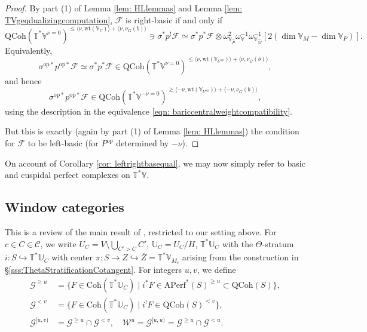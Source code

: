 \documentclass{amsart}
\theoremstyle{definition}
\theoremstyle{remark}
\numberwithin{equation}{section}
\newcommand{\U}{\mathbb{U}}
\newcommand{\mc}{\mathcal}
\newcommand{\op}{\mathrm{op}}
\newcommand{\wh}{\widehat}
\newcommand{\QCoh}{\mathrm{QCoh}}
\newcommand{\Coh}{\mathrm{Coh}}
\newcommand{\V}{\mathbb{V}}
\newcommand{\T}{\mathbb{T}}
\newcommand{\Aperf}{\mathrm{APerf}}
\newcommand{\wt}{\mathrm{wt}}
\begin{document}
\begin{proof}
By part (1) of Lemma \ref{lem: HLlemmas} and Lemma \ref{lem: TVgeqdualizingcomputation}, $\mc{F}$ is right-basic if and only if
\begin{equation*}
   \QCoh(\T^{\ast}\V^{\nu = 0})^{ \leq \langle \nu, \wt(\V_U) \rangle + \langle \nu, \nu_G(b)\rangle}  \ni \sigma^{\ast} p^! \mc{F} \simeq \sigma^{\ast} p^{\ast} \mc{F} \otimes \omega^2_{\V_{\wh{P}}}\omega_{\V}^{-1} \omega_{\V_{\wh{M}}}^{-1}[2(\dim \V_M - \dim \V_P)].
\end{equation*}
Equivalently,
\begin{equation*}
    \sigma^{\op \ast}p^{\op \ast} \mc{F} \simeq \sigma^{\ast}p^{\ast} \mc{F} \in \QCoh(\T^{\ast}\V^{\nu = 0})^{ \leq \langle \nu, \wt(\V_{U^{\op}}) \rangle + \langle \nu, \nu_G(b)\rangle},
\end{equation*}
and hence
\begin{equation*}
    \sigma^{\op \ast}p^{\op \ast} \mc{F} \in \QCoh(\T^{\ast}\V^{-\nu = 0})^{ \geq \langle -\nu, \wt(\V_{U^{\op}}) \rangle + \langle -\nu, \nu_G(b)\rangle},
\end{equation*}
using the description in the equivalence \eqref{eqn: bariccentralweightcompatibility}.

But this is exactly (again by part (1) of Lemma \ref{lem: HLlemmas}) the condition for $\mc{F}$ to be left-basic (for $P^{\op}$ determined by $- \nu$).
\end{proof}
On account of Corollary \ref{cor: leftrightbasequal}, we may now simply refer to basic and cuspidal perfect complexes on $\T^{\ast} \V$.

\subsection{Window categories}{\label{ss: windowcat}}

This is a review of the main result of \cite{HalpernLeistner}, restricted to our setting above. For $c \in C\in \mathcal{C}$, we write $U_C=V\setminus \bigcup_{C'> C} C'$, $\U_C=U_C/H$, $\T^{\ast}\U_C$ with the $\Theta$-stratum $i\colon S \hookrightarrow \T^{\ast}\U_C$ with center $\pi\colon S\to Z\hookrightarrow \overline{Z}=\T^{\ast}\V_{M_c}$ arising from the construction in \S \ref{sss:ThetaStratificationCotangent}. For integers $u,v$, we define
\begin{align*}
\mathcal{G}^{\geq u}&=\{F \in \Coh(\T^{\ast}\U_C) \mid i^* F\in \Aperf^*(S)^{\geq u}\subset \QCoh(S)\}, \\
\mathcal{G}^{< v}&=\{F \in \Coh(\T^{\ast}\U_C) \mid i^{!} F\in \QCoh(S)^{< v}\}, \\
\mathcal{G}^{[u,v)}&=\mathcal{G}^{\geq u} \cap \mathcal{G}^{ < v}, \quad
\mathcal{W}^{u}=\mathcal{G}^{[u,u)}=\mathcal{G}^{\geq u} \cap \mathcal{G}^{ < u}. 
\end{align*}
\end{document}
